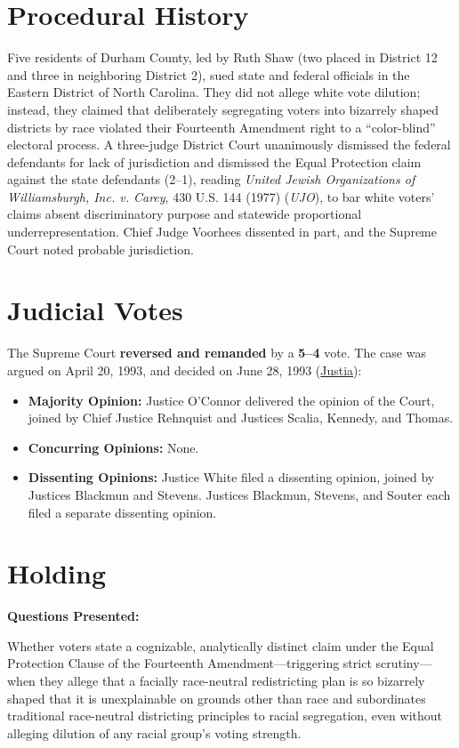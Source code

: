 \documentclass[12pt]{article}
\begin{document}
\section{Procedural History}
Five residents of Durham County, led by Ruth Shaw (two placed in District 12 and three in neighboring District 2), sued state and federal officials in the Eastern District of North Carolina. They did not allege white vote dilution; instead, they claimed that deliberately segregating voters into bizarrely shaped districts by race violated their Fourteenth Amendment right to a ``color-blind'' electoral process. A three-judge District Court unanimously dismissed the federal defendants for lack of jurisdiction and dismissed the Equal Protection claim against the state defendants (2--1), reading \textit{United Jewish Organizations of Williamsburgh, Inc. v. Carey}, 430 U.S. 144 (1977) (\textit{UJO}), to bar white voters' claims absent discriminatory purpose and statewide proportional underrepresentation. Chief Judge Voorhees dissented in part, and the Supreme Court noted probable jurisdiction.

\section{Judicial Votes}
The Supreme Court \textbf{reversed and remanded} by a \textbf{5--4} vote. The case was argued on April 20, 1993, and decided on June 28, 1993 (\href{https://supreme.justia.com/cases/federal/us/509/630/}{Justia}):

\begin{itemize}
    \item \textbf{Majority Opinion:} Justice O'Connor delivered the opinion of the Court, joined by Chief Justice Rehnquist and Justices Scalia, Kennedy, and Thomas.
    \item \textbf{Concurring Opinions:} None.
    \item \textbf{Dissenting Opinions:} Justice White filed a dissenting opinion, joined by Justices Blackmun and Stevens. Justices Blackmun, Stevens, and Souter each filed a separate dissenting opinion.
\end{itemize}

\section{Holding}
\textbf{Questions Presented:}

Whether voters state a cognizable, analytically distinct claim under the Equal Protection Clause of the Fourteenth Amendment---triggering strict scrutiny---when they allege that a facially race-neutral redistricting plan is so bizarrely shaped that it is unexplainable on grounds other than race and subordinates traditional race-neutral districting principles to racial segregation, even without alleging dilution of any racial group's voting strength.
\end{document}
